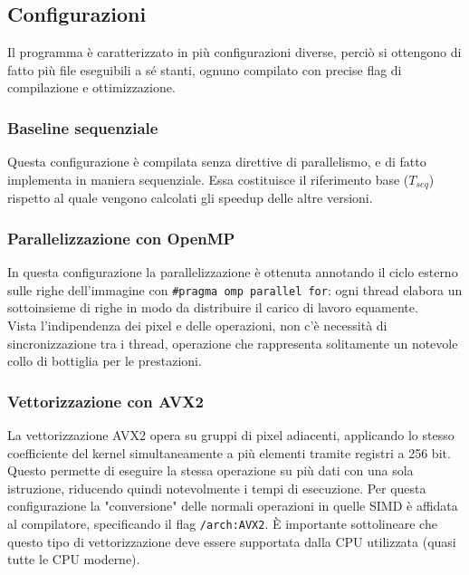 \documentclass{article}
\newcommand{\code}[1]{\texttt{#1}}
\begin{document}
\subsection{Configurazioni}
Il programma è caratterizzato in più configurazioni diverse, perciò si ottengono di fatto più file eseguibili a sé stanti, ognuno compilato con precise flag di compilazione e ottimizzazione.

\subsubsection{Baseline sequenziale}
Questa configurazione è compilata senza direttive di parallelismo, e di fatto implementa in maniera sequenziale. Essa costituisce il riferimento base ($T_{seq}$) rispetto al quale vengono calcolati gli speedup delle altre versioni.

\subsubsection{Parallelizzazione con OpenMP}
In questa configurazione la parallelizzazione è ottenuta annotando il ciclo esterno sulle righe dell'immagine con \code{\#pragma omp parallel for}: ogni thread elabora un sottoinsieme di righe in modo da distribuire il carico di lavoro equamente.\\
\noindent Vista l'indipendenza dei pixel e delle operazioni, non c'è necessità di sincronizzazione tra i thread, operazione che rappresenta solitamente un notevole collo di bottiglia per le prestazioni.


\subsubsection{Vettorizzazione con AVX2}
La vettorizzazione AVX2 opera su gruppi di pixel adiacenti, applicando lo stesso coefficiente del kernel simultaneamente a più elementi tramite registri a 256 bit. Questo permette di eseguire la stessa operazione su più dati con una sola istruzione, riducendo quindi notevolmente i tempi di esecuzione.
Per questa configurazione la "conversione" delle normali operazioni in quelle SIMD è affidata al compilatore, specificando il flag \code{/arch:AVX2}.
\noindent È importante sottolineare che questo tipo di vettorizzazione deve essere supportata dalla CPU utilizzata (quasi tutte le CPU moderne).
\end{document}
